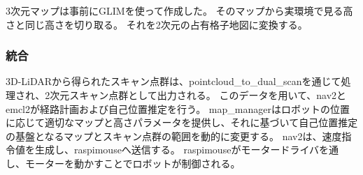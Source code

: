 3次元マップは事前にGLIMを使って作成した。
そのマップから実環境で見る高さと同じ高さを切り取る。
それを2次元の占有格子地図に変換する。


\subsubsection{統合}
3D-LiDARから得られたスキャン点群は、pointcloud\_to\_dual\_scanを通じて処理され、2次元スキャン点群として出力される。
このデータを用いて、nav2とemcl2が経路計画および自己位置推定を行う。
map\_managerはロボットの位置に応じて適切なマップと高さパラメータを提供し、それに基づいて自己位置推定の基盤となるマップとスキャン点群の範囲を動的に変更する。
nav2は、速度指令値を生成し、raspimouseへ送信する。
raspimouseがモータードライバを通し、モーターを動かすことでロボットが制御される。


